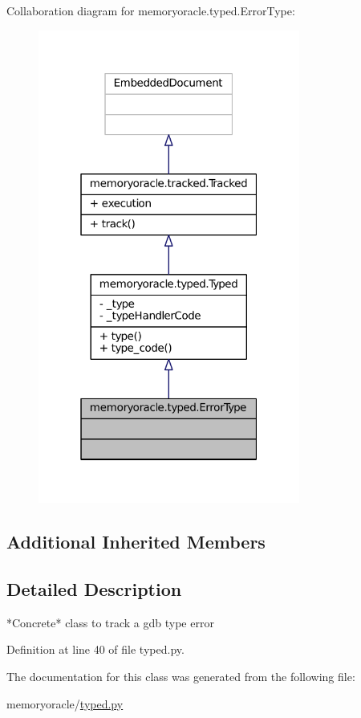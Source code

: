 Collaboration diagram for memoryoracle.\+typed.\+Error\+Type\+:
\nopagebreak
\begin{figure}[H]
\begin{center}
\leavevmode
\includegraphics[width=244pt]{classmemoryoracle_1_1typed_1_1ErrorType__coll__graph}
\end{center}
\end{figure}
\subsection*{Additional Inherited Members}


\subsection{Detailed Description}
\begin{DoxyVerb}*Concrete* class to track a gdb type error
\end{DoxyVerb}
 

Definition at line 40 of file typed.\+py.



The documentation for this class was generated from the following file\+:\begin{DoxyCompactItemize}
\item 
memoryoracle/\hyperlink{typed_8py}{typed.\+py}\end{DoxyCompactItemize}
